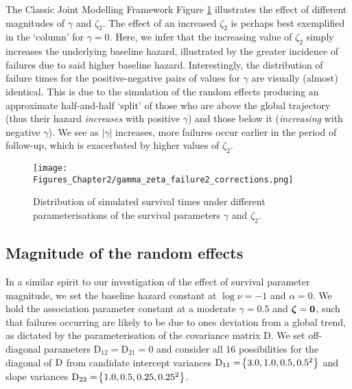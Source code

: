 \begin{chapter}{\label{cha:methods-classic}The Classic Joint Modelling Framework}
  Figure \ref{fig:sim-gammazeta} illustrates the effect of different magnitudes of $\gamma$ and $\zeta_2$. The effect of an increased $\zeta_2$ is perhaps best exemplified in the `column' for $\gamma = 0$. Here, we infer that the increasing value of $\zeta_2$ simply increases the underlying baseline hazard, illustrated by the greater incidence of failures due to said higher baseline hazard. Interestingly, the distribution of failure times for the positive-negative pairs of values for $\gamma$ are visually (almost) identical. This is due to the simulation of the random effects producing an approximate half-and-half `split' of those who are above the global trajectory (thus their hazard \textit{increases} with positive $\gamma$) and those below it (\textit{increasing} with negative $\gamma$). We see as $|\gamma|$ increases, more failures occur earlier in the period of follow-up, which is exacerbated by higher values of $\zeta_2$.
  \begin{figure}[t]
    \centering
    \texttt{[image: Figures\_Chapter2/gamma\_zeta\_failure2\_corrections.png]}
    \caption{Distribution of simulated survival times under different parameterisations of the survival parameters $\gamma$ and $\zeta_2$.}
  \label{fig:sim-gammazeta}
  \end{figure}
  
  \subsection{Magnitude of the random effects}\label{sec:sim-considerations-D}
  In a similar spirit to our investigation of the effect of survival parameter magnitude, we set the baseline hazard constant at $\log\nu=-1$ and $\alpha=0$. We hold the association parameter constant at a moderate $\gamma = 0.5$ and $\bm{\zeta}=\bm{0}$, such that failures occurring are likely to be due to ones deviation from a global trend, as dictated by the parameterisation of the covariance matrix $\mathrm{D}$. We set off-diagonal parameters $\mathrm{D}_{12}=\mathrm{D}_{21}=0$ and consider all $16$ possibilities for the diagonal of $\mathrm{D}$ from candidate intercept variances $\mathrm{D}_{11} = \!\left\{3.0, 1.0, 0.5, 0.5^2\right\}$ and slope variances $\mathrm{D}_{22} = \!\left\{1.0, 0.5, 0.25, 0.25^2\right\}$.
  

\end{chapter}
